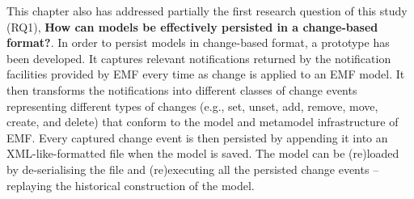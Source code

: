 This chapter also has addressed partially the first research question of this study (RQ1), \textbf{How can models be effectively persisted in a change-based format?}. In order to persist models in change-based format, a prototype has been developed. It captures relevant notifications returned by the notification facilities provided by EMF every time as change is applied to an EMF model. It then transforms the notifications into different classes of change events representing different types of changes (e.g., set, unset, add, remove, move, create, and delete) that conform to the model and metamodel infrastructure of EMF. Every captured change event is then persisted by appending it into an XML-like-formatted file when the model is saved. The model can be (re)loaded by de-serialising the file and (re)executing all the persisted change events -- replaying the historical construction of the model.


